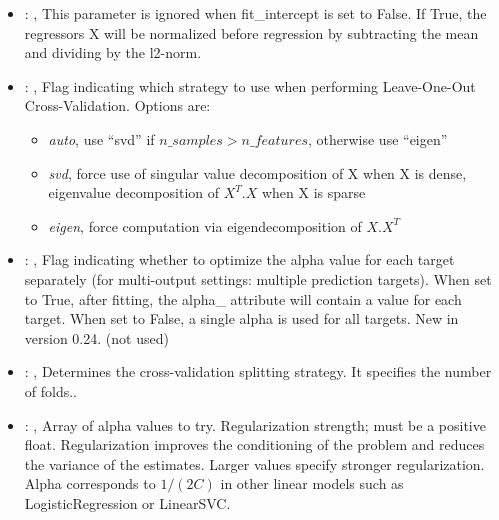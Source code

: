 \begin{itemize}
    \item {}: , 
      This parameter is ignored when fit\_intercept is set to False. If True, the
      regressors X will be normalized before regression by subtracting the mean and dividing
      by the l2-norm.

    \item {}: , 
      Flag indicating which strategy to use when performing Leave-One-Out Cross-Validation.
      Options are:                                                  \begin{itemize}
      \item \textit{auto}, use ``svd'' if $n\_samples > n\_features$, otherwise use ``eigen''
      \item \textit{svd}, force use of singular value decomposition of X when X is
      dense, eigenvalue decomposition of $X^T.X$ when X is sparse
      \item \textit{eigen}, force computation via eigendecomposition of $X.X^T$
      \end{itemize}

    \item {}: , 
      Flag indicating whether to optimize the alpha value for each target separately
      (for multi-output settings: multiple prediction targets). When set to True, after fitting,
      the alpha\_ attribute will contain a value for each target. When set to False, a single alpha
      is used for all targets. New in version 0.24. (not used)

    \item {}: , 
      Determines the cross-validation splitting strategy.
      It specifies the number of folds..

    \item {}: , 
      Array of alpha values to try. Regularization strength; must be a positive float.
      Regularization                                                  improves the conditioning of
      the problem and reduces the variance of the estimates.
      Larger values specify stronger regularization. Alpha corresponds to $1 / (2C)$ in other
      linear models such as LogisticRegression or LinearSVC.


\end{itemize}
